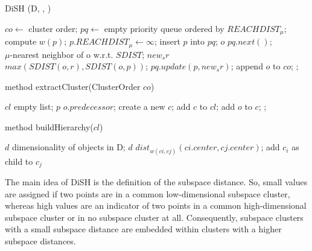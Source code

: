 \documentclass{article}
\begin{document}
\begin{algorithm}
\caption{DiSH (D, \mu, \epsilon)}
\begin{algorithmic}
\STATE $co \leftarrow$ cluster order; 
\STATE $pq \leftarrow$ empty priority queue ordered by \mathcal $REACHDIST_{\mu};$
\STATE compute $w(p)$;
\STATE \mathcal $p.REACHDIST_{\mu} \leftarrow \infty$;
\STATE insert $p$ into $pq$;
\STATE $o$ \leftarrow $pq.next()$; \\
\STATE $\mu$-nearest neighbor of o w.r.t. $SDIST$;
\STATE $new_sr$ \leftarrow $max(SDIST(o, r), SDIST(o, p))$;
\STATE $pq.update(p, new_sr)$;
\STATE append $o$ to $co$;
;
\end{algorithmic}
\label{The algorithm DiSH}
\end{algorithm}

\begin{algorithm}
\caption{method extractCluster(ClusterOrder $co$)}
\begin{algorithmic}
\STATE $cl$ \leftarrow empty list; 
\STATE $p$ \leftarrow $o.predecessor$;
\STATE create a new $c$;
\STATE add $c$ to $cl$;
\STATE add $o$ to $c$;
;
\end{algorithmic}
\label{Method for ectracting clusters from the cluster order}
\end{algorithm}

\begin{algorithm}
\caption{method buildHierarchy($cl$)}
\begin{algorithmic}
\STATE $d$ \leftarrow dimensionality of objects in D;
\STATE $d$ \leftarrow \mathcal $dist_{w(ci, cj)}(ci.center, cj.center)$;
\STATE add \mathcal $c_{i}$ as child to \mathcal $c_{j}$
\end{algorithmic}
\end{algorithm}

The main idea of DiSH is the definition of the subspace distance. So, small values are assigned if two points are in a common low-dimensional subspace cluster, whereas high values are an indicator of two points in a common high-dimensional subspace cluster or in no subspace cluster at all. Consequently, subspace clusters with a small subspace distance are embedded within clusters with a higher subspace distances.\par
\end{document}
